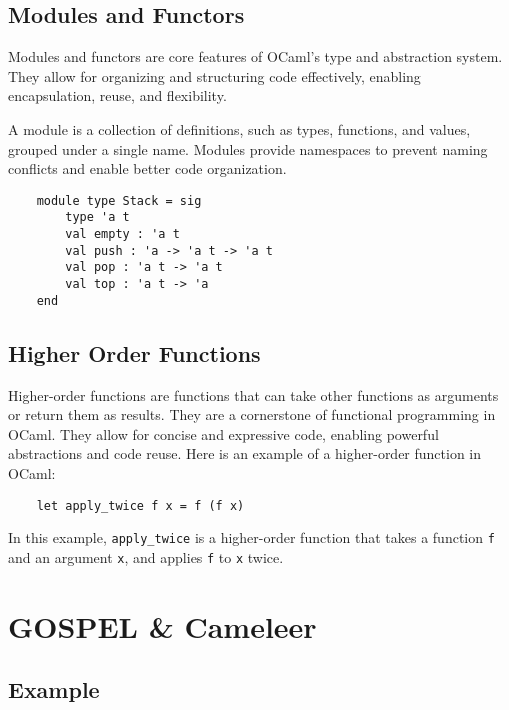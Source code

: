 \subsection{Modules and Functors} %
\label{sub:modules_and_functors}

Modules and functors are core features of OCaml’s type and abstraction system. 
They allow for organizing and structuring code effectively, enabling encapsulation, 
reuse, and flexibility.

A module is a collection of definitions, such as types, functions, and values, 
grouped under a single name. Modules provide namespaces to prevent naming conflicts 
and enable better code organization.

\begin{verbatim}
    module type Stack = sig
        type 'a t
        val empty : 'a t
        val push : 'a -> 'a t -> 'a t
        val pop : 'a t -> 'a t
        val top : 'a t -> 'a
    end
\end{verbatim}

\subsection{Higher Order Functions}
\label{sub:higher_order_functions}

Higher-order functions are functions that can take other functions as arguments 
or return them as results. They are a cornerstone of functional programming in OCaml.
They allow 
for concise and expressive code, enabling powerful abstractions and code reuse. Here is an example of a higher-order function in OCaml:

\begin{verbatim}
    let apply_twice f x = f (f x)
\end{verbatim}

In this example, \texttt{apply\_twice} is a higher-order function that takes a function \texttt{f} and an argument \texttt{x}, and applies \texttt{f} to \texttt{x} twice.

\section{GOSPEL \& Cameleer}
\label{sec:gospel_and_cameleer}

\subsection{Example}
\label{sub:example}

